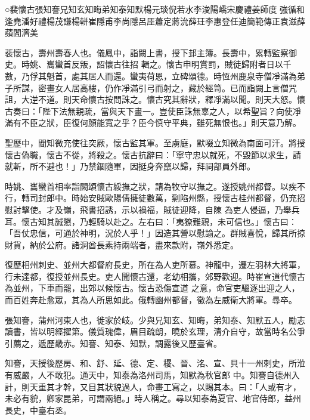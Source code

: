 
\begin{pinyinscope}

 ○裴懷古張知謇兄知玄知晦弟知泰知默楊元琰倪若水李浚陽嶠宋慶禮姜師度
 強循和逢堯潘好禮楊茂謙楊軿崔隱甫李尚隱呂厓蕭定蔣沇薛玨李惠登任迪簡範傳正袁滋薛蘋閻濟美



 裴懷古，壽州壽春人也。儀鳳中，詣闕上書，授下邽主簿。長壽中，累轉監察御史。時姚、巂蠻首反叛，詔懷古往招
 輯之。懷古申明賞罰，賊徒歸附者日以千數，乃俘其魁首，處其居人而還。蠻夷荷恩，立碑頌德。時恆州鹿泉寺僧凈滿為弟子所謀，密畫女人居高樓，仍作凈滿引弓而射之，藏於經笥。已而詣闕上言僧咒詛，大逆不道。則天命懷古按問誅之。懷古究其辭狀，釋凈滿以聞。則天大怒。懷古奏曰：「陛下法無親疏，當與天下畫一。豈使臣誅無辜之人，以希聖旨？向使凈滿有不臣之狀，臣復何顏能寬之乎？臣今慎守平典，雖死無恨也。」則天意乃解。



 聖歷中，閻知微充使往突厥，懷古監其軍。至虜庭，默啜立知微為南面可汗。將授懷古偽職，懷古不從，將殺之。懷古抗辭曰：「寧守忠以就死，不毀節以求生，請就斬，所不避也！」乃禁錮隨軍，因挺身奔竄以歸，拜祠部員外郎。



 時姚、巂蠻首相率詣闕頌懷古綏撫之狀，請為牧守以撫之。遂授姚州都督。以疾不行，轉司封郎中。時始安賊歐陽倩擁徒數萬，剽陷州縣，授懷古桂州都督，仍充招慰討擊使。才及嶺，飛書招誘，示以禍福，賊徒迎降，自陳
 為吏人侵逼，乃舉兵耳。懷古知其誠懇，乃輕騎以赴之。左右曰：「夷獠難親，未可信也。」懷古曰：「吾仗忠信，可通於神明，況於人乎！」因造其營以慰諭之。群賊喜悅，歸其所掠財貨，納於公府。諸洞酋長素持兩端者，盡來款附，嶺外悉定。



 復歷相州刺史、並州大都督府長史，所在為人吏所慕。神龍中，遷左羽林大將軍，行未達都，復授並州長史。吏人聞懷古還，老幼相攜，郊野歡迎。時崔宣道代懷古為並州，下車而罷，出郊以候懷古。懷古恐傷宣道
 之意，命官吏驅逐出迎之人，而百姓奔赴愈眾，其為人所思如此。俄轉幽州都督，徵為左威衛大將軍。尋卒。



 張知謇，蒲州河東人也，徙家於岐。少與兄知玄、知晦，弟知泰、知默五人，勵志讀書，皆以明經擢第。儀質瑰偉，眉目疏朗，曉於玄理，清介自守，故當時名公爭引薦之，遞歷畿赤。知謇、知泰、知默，調露後又歷臺省。



 知謇，天授後歷房、和、舒、延、德、定、稷、晉、洺、宣、貝十一州刺史，所涖有威嚴，人不敢犯。通天中，知泰為洛州司馬，知默為秋官郎
 中。知謇自德州入計，則天重其才幹，又目其狀貌過人，命畫工寫之，以賜其本。曰：「人或有才，未必有貌，卿家昆弟，可謂兩絕。」時人稱之。尋以知泰為夏官、地官侍郎，益州長史，中臺右丞。




\end{pinyinscope}
